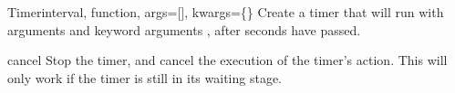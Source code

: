 \begin{classdesc}{Timer}{interval, function, args=[], kwargs=\{\}}
Create a timer that will run  with arguments  and 
keyword arguments , after  seconds have passed.
\end{classdesc}

\begin{methoddesc}{cancel}{}
Stop the timer, and cancel the execution of the timer's action.  This
will only work if the timer is still in its waiting stage.
\end{methoddesc}
